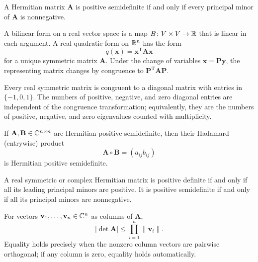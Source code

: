 \begin{proposition}
A Hermitian matrix $\mathbf{A}$ is positive semidefinite if and only if every principal minor of $\mathbf{A}$ is nonnegative.
\end{proposition}

\begin{definition}
A bilinear form on a real vector space is a map $B\colon V\times V\to\mathbb{R}$ that is linear in each argument. A real quadratic form on $\mathbb{R}^n$ has the form
\[
 q(\mathbf{x})=\mathbf{x}^{\mathrm{T}}\mathbf{A}\mathbf{x}
\]
for a unique symmetric matrix $\mathbf{A}$. Under the change of variables $\mathbf{x}=\mathbf{P}\mathbf{y}$, the representing matrix changes by congruence to $\mathbf{P}^{\mathrm{T}}\mathbf{A}\mathbf{P}$.
\end{definition}
\begin{theorem}
Every real symmetric matrix is congruent to a diagonal matrix with entries in $\{-1,0,1\}$. The numbers of positive, negative, and zero diagonal entries are independent of the congruence transformation; equivalently, they are the numbers of positive, negative, and zero eigenvalues counted with multiplicity.
\end{theorem}

\begin{theorem}
If $\mathbf{A},\mathbf{B}\in\mathbb{C}^{n\times n}$ are Hermitian positive semidefinite, then their Hadamard (entrywise) product
\[
 \mathbf{A}\circ\mathbf{B}=(a_{ij}b_{ij})
\]
is Hermitian positive semidefinite.
\end{theorem}

\begin{theorem}
A real symmetric or complex Hermitian matrix is positive definite if and only if all its leading principal minors are positive. It is positive semidefinite if and only if all its principal minors are nonnegative.
\end{theorem}

\begin{theorem}
For vectors $\mathbf{v}_1,\dots,\mathbf{v}_n\in\mathbb{C}^n$ as columns of $\mathbf{A}$,
\[
 |\det\mathbf{A}|\le\prod_{i=1}^n\|\mathbf{v}_i\|.
\]
Equality holds precisely when the nonzero column vectors are pairwise orthogonal; if any column is zero, equality holds automatically.
\end{theorem}

